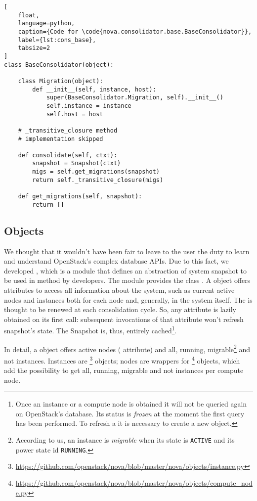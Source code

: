 \begin{lstlisting}[
	float,
	language=python,
	caption={Code for \code{nova.consolidator.base.BaseConsolidator}},
	label={lst:cons_base},
	tabsize=2
]
class BaseConsolidator(object):

	class Migration(object):
		def __init__(self, instance, host):
			super(BaseConsolidator.Migration, self).__init__()
			self.instance = instance
			self.host = host

	# _transitive_closure method
	# implementation skipped

	def consolidate(self, ctxt):
		snapshot = Snapshot(ctxt)
		migs = self.get_migrations(snapshot)
		return self._transitive_closure(migs)

	def get_migrations(self, snapshot):
		return []
\end{lstlisting}

\subsection{Objects}
\label{sub:cons_obj}
We thought that it wouldn't have been fair to leave to the user the duty to learn and understand OpenStack's complex database APIs.
Due to this fact, we developed , which is a module that defines an abstraction of system snapshot to be used in method  by developers. The module provides the class . A  object offers attributes to access all information about the system, such as current active nodes and instances both for each node and, generally, in the system itself. The  is thought to be renewed at each consolidation cycle. So, any attribute is lazily obtained on its first call: subsequent invocations of that attribute won't refresh snapshot's state. The Snapshot is, thus, entirely cached\footnote{Once an instance or a compute node is obtained it will not be queried again on OpenStack's database. Its status is \emph{frozen} at the moment the first query has been performed. To refresh a  it is necessary to create a new  object.}.

In detail, a  object offers active nodes ( attribute) and all, running, migrable\footnote{According to us, an instance is \emph{migrable} when its state is \texttt{ACTIVE} and its power state id \texttt{RUNNING}.} and not instances. Instances are \footnote{\url{https://github.com/openstack/nova/blob/master/nova/objects/instance.py}} objects; nodes are wrappers for \footnote{\url{https://github.com/openstack/nova/blob/master/nova/objects/compute_node.py}} objects, which add the possibility to get all, running, migrable and not instances per compute node.


